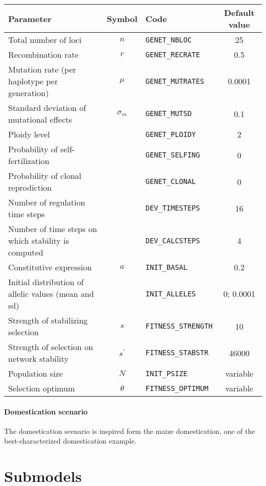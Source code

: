 \documentclass{article}
\begin{document}
\begin{center}
\begin{tabular}{p{4cm}clc}
Parameter & Symbol & Code & Default value \\ \hline
Total number of loci & $n$ & \texttt{GENET\_NBLOC} & 25 \\
Recombination rate & $r$ & \texttt{GENET\_RECRATE} & 0.5 \\
Mutation rate (per haplotype per generation) & $\mu$ & \texttt{GENET\_MUTRATES} & 0.0001 \\
Standard deviation of mutational effects & $\sigma_m$ & \texttt{GENET\_MUTSD} & 0.1 \\
Ploidy level & &  \texttt{GENET\_PLOIDY} & 2 \\
Probability of self-fertilization & & \texttt{GENET\_SELFING} & 0 \\
Probability of clonal reprodiction & & \texttt{GENET\_CLONAL} & 0 \\
Number of regulation time steps & & \texttt{DEV\_TIMESTEPS} & 16 \\
Number of time steps on which stability is computed & & \texttt{DEV\_CALCSTEPS} & 4 \\
Constitutive expression & $a$ & \texttt{INIT\_BASAL} & 0.2 \\
Initial distribution of allelic values (mean and sd)& & \texttt{INIT\_ALLELES} & 0; 0.0001 \\
Strength of stabilizing selection & $s$ & \texttt{FITNESS\_STRENGTH} & 10 \\
Strength of selection on network stability & $s^\prime$ & \texttt{FITNESS\_STABSTR} & 46000 \\ \hline
Population size & $N$ & \texttt{INIT\_PSIZE} & variable \\
Selection optimum & $\theta$ & \texttt{FITNESS\_OPTIMUM} & variable \\ 
\end{tabular}
\end{center}

\paragraph{Domestication scenario} 

The domestication scenario is inspired form the maize domestication, one of the best-characterized domestication example. 

\section{Submodels}
\end{document}
